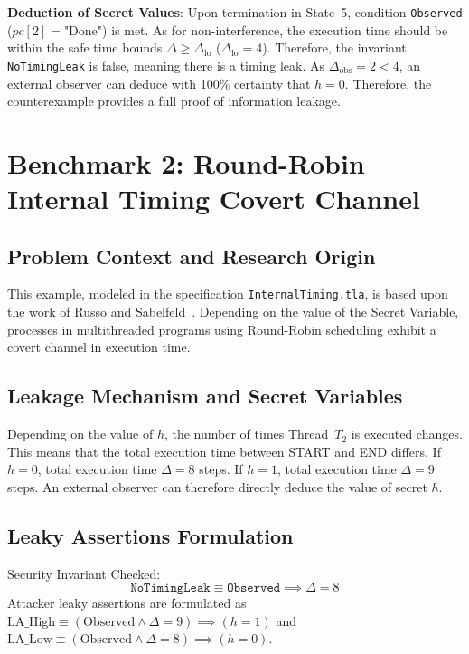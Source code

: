 \documentclass[a4paper,12pt]{report}
\begin{document}
\noindent\textbf{Deduction of Secret Values}:
Upon termination in State~5, condition \texttt{Observed} ($pc[2] = \text{"Done"}$) is met. As for non-interference, the execution time should be within the safe time bounds $\Delta \ge \Delta_{\text{lo}}$ ($\Delta_{\text{lo}} = 4$). Therefore, the invariant \texttt{NoTimingLeak} is false, meaning there is a timing leak. As $\Delta_{\text{obs}} = 2 < 4$, an external observer can deduce with 100\% certainty that $h = 0$. Therefore, the counterexample provides a full proof of information leakage.

\section{Benchmark 2: Round-Robin Internal Timing Covert Channel}

\subsection{Problem Context and Research Origin}
This example, modeled in the specification \texttt{InternalTiming.tla}, is based upon the work of Russo and Sabelfeld~\cite{russo2006closing}. Depending on the value of the Secret Variable, processes in multithreaded programs using Round-Robin scheduling exhibit a covert channel in execution time.

\subsection{Leakage Mechanism and Secret Variables}
Depending on the value of $h$, the number of times Thread~$T_2$ is executed changes. This means that the total execution time between START and END differs. If $h = 0$, total execution time $\Delta = 8$ steps. If $h = 1$, total execution time $\Delta = 9$ steps. An external observer can therefore directly deduce the value of secret $h$.

\subsection{Leaky Assertions Formulation}
Security Invariant Checked:
\begin{equation}
    \texttt{NoTimingLeak} \equiv \texttt{Observed} \implies \Delta = 8
\end{equation}
Attacker leaky assertions are formulated as $\text{LA\_High} \equiv (\text{Observed} \land \Delta = 9) \implies (h = 1)$ and $\text{LA\_Low} \equiv (\text{Observed} \land \Delta = 8) \implies (h = 0)$.
\end{document}
